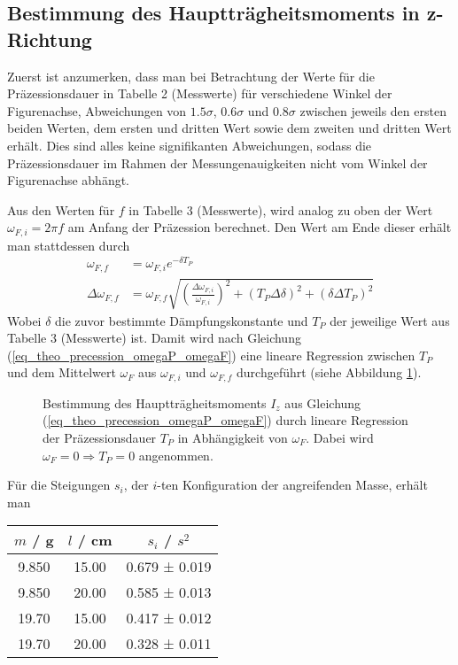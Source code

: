 \documentclass[12pt,a4paper,german]{scrartcl}
\numberwithin{equation}{section}
\begin{document}
  \subsection{Bestimmung des Hauptträgheitsmoments in z-Richtung}
  Zuerst ist anzumerken, dass man bei Betrachtung der Werte für die Präzessionsdauer in Tabelle 2 (Messwerte) für verschiedene Winkel der Figurenachse, Abweichungen von $1.5\sigma$, $0.6\sigma$ und $0.8\sigma$ zwischen jeweils den ersten beiden Werten, dem ersten und dritten Wert sowie dem zweiten und dritten Wert erhält.
  Dies sind alles keine signifikanten Abweichungen, sodass die Präzessionsdauer im Rahmen der Messungenauigkeiten nicht vom Winkel der Figurenachse abhängt.

  Aus den Werten für $f$ in Tabelle 3 (Messwerte), wird analog zu oben der Wert $\omega_{F,i} = 2 \pi f$ am Anfang der Präzession berechnet. Den Wert am Ende dieser erhält man stattdessen durch
  \begin{align}
    \omega_{F,f} &= \omega_{F,i} e^{-\delta T_P} \nonumber \\
    \Delta \omega_{F,f} &= \omega_{F,f}
    \sqrt{\left(\frac{\Delta \omega_{F,i}}{\omega_{F,i}} \right)^2
    + (T_P \Delta \delta)^2 + (\delta \Delta T_P)^2}
  \end{align}
  Wobei $\delta$ die zuvor bestimmte Dämpfungskonstante und $T_P$ der jeweilige Wert aus Tabelle 3 (Messwerte) ist.
  Damit wird nach Gleichung (\ref{eq_theo_precession_omegaP_omegaF}) eine lineare Regression zwischen $T_P$ und dem Mittelwert $\omega_F$ aus $\omega_{F,i}$ und $\omega_{F,f}$ durchgeführt (siehe Abbildung \ref{fig_I_z}).

  \begin{figure}[H]
    \centering
    
    \caption{Bestimmung des Hauptträgheitsmoments $I_z$ aus Gleichung (\ref{eq_theo_precession_omegaP_omegaF}) durch lineare Regression der Präzessionsdauer $T_P$ in Abhängigkeit von $\omega_F$. Dabei wird $\omega_F = 0 \Rightarrow T_P = 0$ angenommen.}
    \label{fig_I_z}
  \end{figure}

  Für die Steigungen $s_i$, der $i$-ten Konfiguration der angreifenden Masse, erhält man
  
  \begin{center}
    \begin{tabular}{c | c | c}
      $m$ / g & $l$ / cm & $s_i$ / $s^2$ \\
      \hline
      9.850 & 15.00 & 0.679 ± 0.019 \\
      9.850 & 20.00 & 0.585 ± 0.013 \\
      19.70 & 15.00 & 0.417 ± 0.012 \\
      19.70 & 20.00 & 0.328 ± 0.011 
    \end{tabular}
    \label{table_I_z_slopes}
  \end{center}
\end{document}
